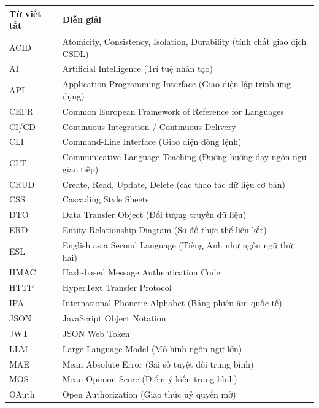 \documentclass[12pt,a4paper,oneside]{report}
\begin{document}
\begin{table}[h]
  \centering
  \renewcommand{\arraystretch}{1.3}
  \begin{tabular}{|l|l|}
    \hline
    \textbf{Từ viết tắt} & \textbf{Diễn giải} \\
    \hline
    ACID  & Atomicity, Consistency, Isolation, Durability (tính chất giao dịch CSDL) \\
    \hline
    AI    & Artificial Intelligence (Trí tuệ nhân tạo) \\
    \hline
    API   & Application Programming Interface (Giao diện lập trình ứng dụng) \\
    \hline
    CEFR  & Common European Framework of Reference for Languages \\
    \hline
    CI/CD & Continuous Integration / Continuous Delivery \\
    \hline
    CLI   & Command-Line Interface (Giao diện dòng lệnh) \\
    \hline
    CLT   & Communicative Language Teaching (Đường hướng dạy ngôn ngữ giao tiếp) \\
    \hline
    CRUD  & Create, Read, Update, Delete (các thao tác dữ liệu cơ bản) \\
    \hline
    CSS   & Cascading Style Sheets \\
    \hline
    DTO   & Data Transfer Object (Đối tượng truyền dữ liệu) \\
    \hline
    ERD   & Entity Relationship Diagram (Sơ đồ thực thể liên kết) \\
    \hline
    ESL   & English as a Second Language (Tiếng Anh như ngôn ngữ thứ hai) \\
    \hline
    HMAC  & Hash-based Message Authentication Code \\
    \hline
    HTTP  & HyperText Transfer Protocol \\
    \hline
    IPA   & International Phonetic Alphabet (Bảng phiên âm quốc tế) \\
    \hline
    JSON  & JavaScript Object Notation \\
    \hline
    JWT   & JSON Web Token \\
    \hline
    LLM   & Large Language Model (Mô hình ngôn ngữ lớn) \\
    \hline
    MAE   & Mean Absolute Error (Sai số tuyệt đối trung bình) \\
    \hline
    MOS   & Mean Opinion Score (Điểm ý kiến trung bình) \\
    \hline
    OAuth & Open Authorization (Giao thức uỷ quyền mở) \\

\end{tabular}
\end{table}
\end{document}
